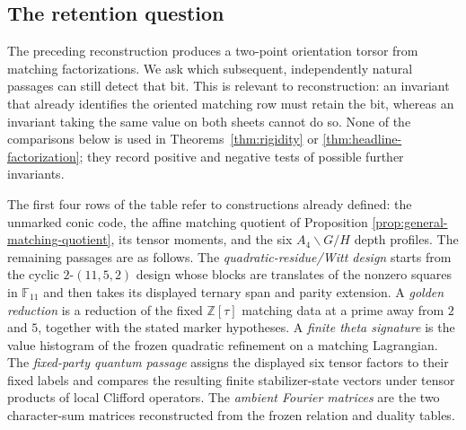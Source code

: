 \documentclass[11pt]{article}
\theoremstyle{definition}
\theoremstyle{remark}
\newcommand{\F}{\mathbb{F}}
\begin{document}
\subsection{The retention question}

The preceding reconstruction produces a two-point orientation torsor from
matching factorizations.  We ask which subsequent, independently natural
passages can still detect that bit.  This is relevant to reconstruction:
an invariant that already identifies the oriented matching row must retain
the bit, whereas an invariant taking the same value on both sheets cannot
do so.  None of the comparisons below is used in
Theorems~\ref{thm:rigidity} or \ref{thm:headline-factorization}; they record
positive and negative tests of possible further invariants.

The first four rows of the table refer to constructions already defined:
the unmarked conic code, the affine matching quotient of Proposition
\ref{prop:general-matching-quotient}, its tensor moments, and the six
$A_4\backslash G/H$ depth profiles.  The remaining passages are as
follows.  The \emph{quadratic-residue/Witt design} starts from the cyclic
$2$-$(11,5,2)$ design whose blocks are translates of the nonzero squares
in $\F_{11}$ and then takes its displayed ternary span and parity
extension.  A \emph{golden reduction} is a reduction of the fixed
$\mathbb Z[\tau]$ matching data at a prime away from $2$ and $5$, together
with the stated marker hypotheses.  A \emph{finite theta signature} is
the value histogram of the frozen quadratic refinement on a matching
Lagrangian.  The \emph{fixed-party quantum passage} assigns the displayed
six tensor factors to their fixed labels and compares the resulting
finite stabilizer-state vectors under tensor products of local Clifford
operators.  The \emph{ambient Fourier matrices} are the two character-sum
matrices reconstructed from the frozen relation and duality tables.
\end{document}
